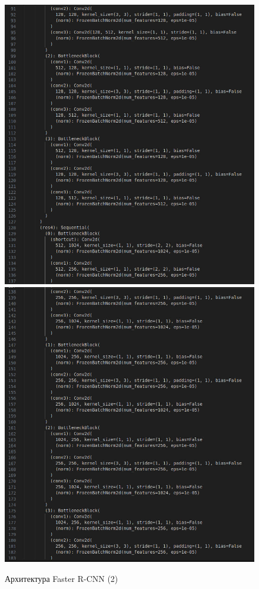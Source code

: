\begin{figure}
	\includegraphics [scale=0.3]{my_folder/images/arch3}
	\includegraphics [scale=0.3]{my_folder/images/arch4}
	\label{fig:arch34}
	\caption{Архитектура Faster R-CNN (2)}
\end{figure}

